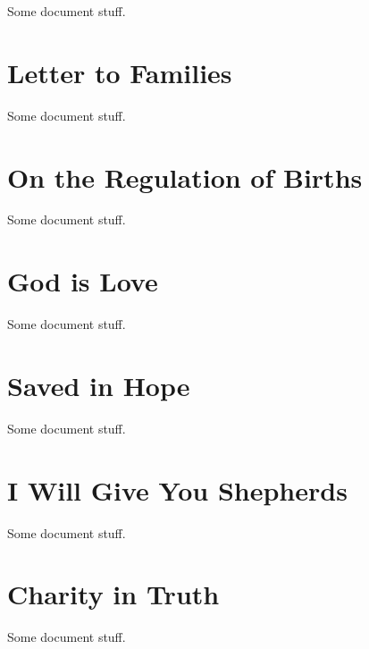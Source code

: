 \documentclass[oneside]{book}
\begin{document}
Some document stuff.


\chapter{Letter to Families}

Some document stuff.


\chapter{On the Regulation of Births}

Some document stuff.


\chapter{God is Love}

Some document stuff.


\chapter{Saved in Hope}

Some document stuff.


\chapter{I Will Give You Shepherds}

Some document stuff.


\chapter{Charity in Truth}

Some document stuff.

\end{document}
